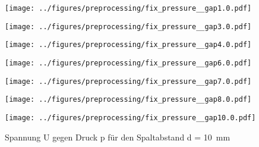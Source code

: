 \begin{figure}[htbp]
    \centering
    \begin{minipage}[t]{0.3\textwidth}
        \centering
        \texttt{[image: ../figures/preprocessing/fix\_pressure\_\_gap1.0.pdf]}
        \caption{Spannung U gegen Druck p für den Spaltabstand d = \SI{1}{\milli\meter}}
        \label{fig:fix_pressure_g1}
    \end{minipage}\hfill
     \begin{minipage}[t]{0.3\textwidth}
        \centering
        \texttt{[image: ../figures/preprocessing/fix\_pressure\_\_gap3.0.pdf]}
        \caption{Spannung U gegen Druck p für den Spaltabstand d = \SI{3}{\milli\meter}}
        \label{fig:fix_pressure_g3}
    \end{minipage}\hfill

   \begin{minipage}[t]{0.3\textwidth}
        \centering
        \texttt{[image: ../figures/preprocessing/fix\_pressure\_\_gap4.0.pdf]}
        \caption{Spannung U gegen Druck p für den Spaltabstand d = \SI{4}{\milli\meter}}
        \label{fig:fix_pressure_g4}
    \end{minipage}\hfill

   \begin{minipage}[t]{0.3\textwidth}
        \centering
        \texttt{[image: ../figures/preprocessing/fix\_pressure\_\_gap6.0.pdf]}
        \caption{Spannung U gegen Druck p für den Spaltabstand d = \SI{6}{\milli\meter}}
        \label{fig:fix_pressure_g6}
    \end{minipage}\hfill

   \begin{minipage}[t]{0.3\textwidth}
        \centering
        \texttt{[image: ../figures/preprocessing/fix\_pressure\_\_gap7.0.pdf]}
        \caption{Spannung U gegen Druck p für den Spaltabstand d = \SI{7}{\milli\meter}}
        \label{fig:fix_pressure_g7}
    \end{minipage}\hfill

   \begin{minipage}[t]{0.3\textwidth}
        \centering
        \texttt{[image: ../figures/preprocessing/fix\_pressure\_\_gap8.0.pdf]}
        \caption{Spannung U gegen Druck p für den Spaltabstand d = \SI{8}{\milli\meter}}
        \label{fig:fix_pressure_g8}
    \end{minipage}\hfill

   \begin{minipage}[t]{0.3\textwidth}
        \centering
        \texttt{[image: ../figures/preprocessing/fix\_pressure\_\_gap10.0.pdf]}
        \caption{Spannung U gegen Druck p für den Spaltabstand d = \SI{10}{\milli\meter}}
        \label{fig:fix_pressure_g10}
    \end{minipage}\hfill


\end{figure}
